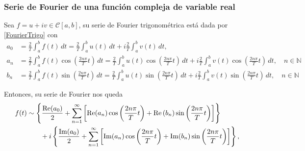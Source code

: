 





\subsubsection{Serie de Fourier de una función compleja de variable real}

Sea $f = u + iv \in \mathscr{C}[a,b]$, su serie de Fourier trigonométrica está dada por \eqref{FourierTrigo} con 
\begin{align*}
    a_0 &= \frac{2}{T} \int_{a}^{b} f(t) \,dt =  \frac{2}{T} \int_a^b u(t) \,dt + i\frac{2}{T} \int_a^b v(t) \,dt,\\
    a_n &= \frac{2}{T} \int_a^b f(t) \cos\left( \frac{2n\pi}{T}t \right) \,dt = \frac{2}{T} \int_a^b u(t) \cos\left( \frac{2n\pi}{T}t \right) \,dt + i\frac{2}{T} \int_a^b v(t) \cos\left( \frac{2n\pi}{T}t \right) \,dt , \quad n \in \mathbb{N} \\
    b_n &= \frac{2}{T} \int_a^b f(t) \sin\left( \frac{2n\pi}{T}t \right) \,dt = \frac{2}{T} \int_a^b u(t) \sin\left( \frac{2n\pi}{T}t \right) \,dt + i\frac{2}{T} \int_a^b v(t) \sin\left( \frac{2n\pi}{T}t \right) \,dt, \quad n \in \mathbb{N}
\end{align*}

Entonces, su serie de Fourier nos queda
\begin{align}
  f(t) & \sim   \left\{ \frac{\operatorname{Re}(a_0)}{2} + \sum_{n=1}^{\infty} \left[ \operatorname{Re}(a_n) \cos\left( \frac{2n\pi}{T}t \right) + \operatorname{Re}\left( b_n \right) \sin\left( \frac{2n\pi}{T}t \right) \right] \right\}  \nonumber \\
   & \qquad + i \left\{ \frac{\operatorname{Im}(a_0)}{2} + \sum_{n=1}^{\infty} \left[\operatorname{Im}(a_n) \cos\left( \frac{2n\pi}{T}t \right) + \operatorname{Im}(b_n) \sin\left( \frac{2n\pi}{T}t \right) \right] \right\},
\end{align}

